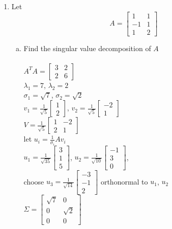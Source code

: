 \documentclass{article}
\begin{document}
{{\begin{enumerate}
\begin{enumerate}[a.]
\end{enumerate}


\newpage\item Let $$A=\left[
\begin{array}{cc}
1 & 1\\
-1 & 1\\
1 & 2
\end{array}\right]$$

\begin{enumerate}[a.]
\item Find the singular value decomposition of $A$
\\
\\$A^TA=\left[\begin{array}{cc} 3 & 2 \\ 2 & 6 \end{array}\right]$
\\$\lambda_1=7$, $\lambda_2=2$
\\$\sigma_1=\sqrt{7}$, $\sigma_2=\sqrt{2}$
\\$v_1=\frac{1}{\sqrt{5}}\left[\begin{array}{c} 1 \\ 2 \end{array}\right]$, $v_2=\frac{1}{\sqrt{5}}\left[\begin{array}{c} -2 \\ 1 \end{array}\right]$
\\$V=\frac{1}{\sqrt{5}}\left[\begin{array}{cc} 1 & -2 \\ 2 & 1 \end{array}\right]$
\\let $u_i=\frac{1}{\sigma_i}Av_i$
\\$u_1=\frac{1}{\sqrt{35}}\left[\begin{array}{c} 3 \\ 1 \\ 5 \end{array}\right]$, $u_2=\frac{1}{\sqrt{10}}\left[\begin{array}{c} -1 \\ 3 \\ 0 \end{array}\right]$, 
\\choose $u_3=\frac{1}{\sqrt{14}}\left[\begin{array}{c} -3 \\ -1 \\ 2 \end{array}\right]$ orthonormal to $u_1$, $u_2$
\\$\Sigma = \left[\begin{array}{cc} \sqrt{7} & 0 \\ 0 & \sqrt{2} \\ 0 & 0 \end{array}\right]$

\end{enumerate}
\end{enumerate}}}
\end{document}
